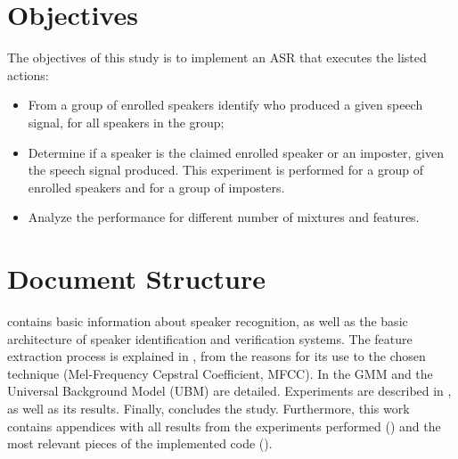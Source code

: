 \section{Objectives}

The objectives of this study is to implement an ASR that executes the listed actions:

\begin{itemize}\itemsep0pt
    \item From a group of enrolled speakers identify who produced a given speech signal, for all speakers in the group;
    \item Determine if a speaker is the claimed enrolled speaker or an imposter, given the speech signal produced. This experiment is performed for a group of enrolled speakers and for a group of imposters.
    \item Analyze the performance for different number of mixtures and features.
\end{itemize}

\section{Document Structure}

 contains basic information about speaker recognition, as well as the basic architecture of speaker identification and verification systems. The feature extraction process is explained in , from the reasons for its use to the chosen technique (Mel-Frequency Cepstral Coefficient, MFCC). In  the GMM and the Universal Background Model (UBM) are detailed. Experiments are described in , as well as its results. Finally,  concludes the study. Furthermore, this work contains appendices with all results from the experiments performed () and the most relevant pieces of the implemented code ().
